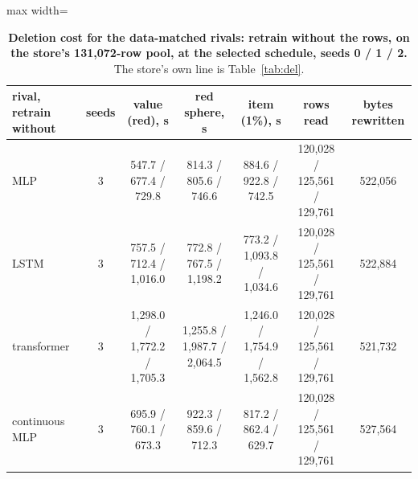 \documentclass{article} %
\begin{document}
\begin{table}[h]
\centering\small
\caption{\textbf{Deletion cost for the data-matched rivals: retrain without the rows, on the store's %
131,072-row pool, at the selected schedule, seeds 0 / 1 / 2.} The store's own line is %
Table~\ref{tab:del}.}
\label{tab:rivals-del}
\setlength{\tabcolsep}{3pt}
\begin{adjustbox}{max width=\linewidth}\begin{tabular}{lcccccc}
\toprule
rival, retrain without & seeds & value (red), s & red sphere, s & item (1\%), s & rows read & bytes rewritten \\
\midrule
MLP & 3 & 547.7 / 677.4 / 729.8 & 814.3 / 805.6 / 746.6 & 884.6 / 922.8 / 742.5 & 120,028 / 125,561 / 129,761 & 522,056 \\
LSTM & 3 & 757.5 / 712.4 / 1,016.0 & 772.8 / 767.5 / 1,198.2 & 773.2 / 1,093.8 / 1,034.6 & 120,028 / 125,561 / 129,761 & 522,884 \\
transformer & 3 & 1,298.0 / 1,772.2 / 1,705.3 & 1,255.8 / 1,987.7 / 2,064.5 & 1,246.0 / 1,754.9 / 1,562.8 & 120,028 / 125,561 / 129,761 & 521,732 \\
continuous MLP & 3 & 695.9 / 760.1 / 673.3 & 922.3 / 859.6 / 712.3 & 817.2 / 862.4 / 629.7 & 120,028 / 125,561 / 129,761 & 527,564 \\
\bottomrule
\end{tabular}\end{adjustbox}
\end{table}
\end{document}
